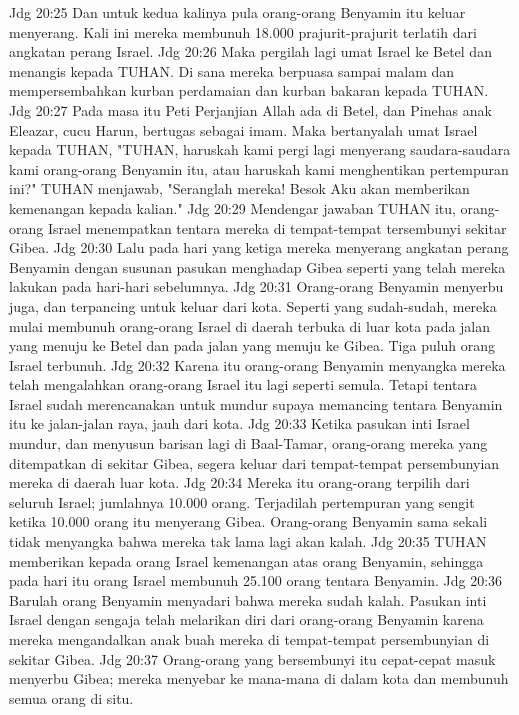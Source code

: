 Jdg 20:25  Dan untuk kedua kalinya pula orang-orang Benyamin itu keluar menyerang. Kali ini mereka membunuh 18.000 prajurit-prajurit terlatih dari angkatan perang Israel.
Jdg 20:26  Maka pergilah lagi umat Israel ke Betel dan menangis kepada TUHAN. Di sana mereka berpuasa sampai malam dan mempersembahkan kurban perdamaian dan kurban bakaran kepada TUHAN.
Jdg 20:27  Pada masa itu Peti Perjanjian Allah ada di Betel, dan Pinehas anak Eleazar, cucu Harun, bertugas sebagai imam. Maka bertanyalah umat Israel kepada TUHAN, "TUHAN, haruskah kami pergi lagi menyerang saudara-saudara kami orang-orang Benyamin itu, atau haruskah kami menghentikan pertempuran ini?" TUHAN menjawab, "Seranglah mereka! Besok Aku akan memberikan kemenangan kepada kalian."
Jdg 20:29  Mendengar jawaban TUHAN itu, orang-orang Israel menempatkan tentara mereka di tempat-tempat tersembunyi sekitar Gibea.
Jdg 20:30  Lalu pada hari yang ketiga mereka menyerang angkatan perang Benyamin dengan susunan pasukan menghadap Gibea seperti yang telah mereka lakukan pada hari-hari sebelumnya.
Jdg 20:31  Orang-orang Benyamin menyerbu juga, dan terpancing untuk keluar dari kota. Seperti yang sudah-sudah, mereka mulai membunuh orang-orang Israel di daerah terbuka di luar kota pada jalan yang menuju ke Betel dan pada jalan yang menuju ke Gibea. Tiga puluh orang Israel terbunuh.
Jdg 20:32  Karena itu orang-orang Benyamin menyangka mereka telah mengalahkan orang-orang Israel itu lagi seperti semula. Tetapi tentara Israel sudah merencanakan untuk mundur supaya memancing tentara Benyamin itu ke jalan-jalan raya, jauh dari kota.
Jdg 20:33  Ketika pasukan inti Israel mundur, dan menyusun barisan lagi di Baal-Tamar, orang-orang mereka yang ditempatkan di sekitar Gibea, segera keluar dari tempat-tempat persembunyian mereka di daerah luar kota.
Jdg 20:34  Mereka itu orang-orang terpilih dari seluruh Israel; jumlahnya 10.000 orang. Terjadilah pertempuran yang sengit ketika 10.000 orang itu menyerang Gibea. Orang-orang Benyamin sama sekali tidak menyangka bahwa mereka tak lama lagi akan kalah.
Jdg 20:35  TUHAN memberikan kepada orang Israel kemenangan atas orang Benyamin, sehingga pada hari itu orang Israel membunuh 25.100 orang tentara Benyamin.
Jdg 20:36  Barulah orang Benyamin menyadari bahwa mereka sudah kalah. Pasukan inti Israel dengan sengaja telah melarikan diri dari orang-orang Benyamin karena mereka mengandalkan anak buah mereka di tempat-tempat persembunyian di sekitar Gibea.
Jdg 20:37  Orang-orang yang bersembunyi itu cepat-cepat masuk menyerbu Gibea; mereka menyebar ke mana-mana di dalam kota dan membunuh semua orang di situ.
